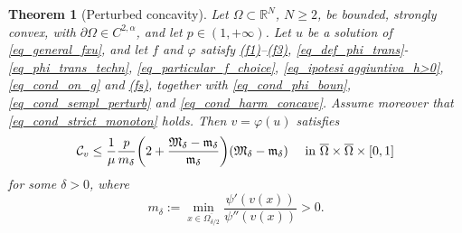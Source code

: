\documentclass[11pt, reqno]{amsart}
\newtheorem{theorem}[lemma]{Theorem}
\theoremstyle{definition}
\numberwithin{equation}{section}
\newcommand{\R}{\mathbb{R}}
\newcommand{\mc}[1]{\mathcal{#1}}
\begin{document}
\begin{theorem}[Perturbed concavity]
\label{thm_gen_perturb_concav}
Let $\Omega \subset \R^N$, $N\geq 2$, be bounded, strongly convex, with $\partial \Omega \in C^{2,\alpha}$, and let $p\in (1,+\infty)$.
Let $u$ be a solution of \eqref{eq_general_fxu}, and let $f$ and $\varphi$ satisfy \hyperlink{(f1)}{\rm{(f1)}}--\hyperlink{(f3)}{\rm{(f3)}}, \eqref{eq_def_phi_trans}-\eqref{eq_phi_trans_techn}, \eqref{eq_particular_f_choice}, \eqref{eq_ipotesi aggiuntiva_h>0}, \eqref{eq_cond_on_g} and \hyperlink{(fs)}{\rm{(fs)}}, together with \eqref{eq_cond_phi_boun}, \eqref{eq_cond_sempl_perturb} and \eqref{eq_cond_harm_concave}. 
Assume moreover that \eqref{eq_cond_strict_monoton} holds. 
Then $v=\varphi(u)$ satisfies 
\begin{equation}\label{eq_general_error_estimate}
\mc{C}_{v} \leq \frac{1}{\mu} \frac{p}{m_{\delta}} \bigg( 2 + \frac{\mathfrak{M}_{\delta} - \mathfrak{m}_{\delta}}{\mathfrak{m}_{\delta}}\bigg) (\mathfrak{M}_{\delta}-\mathfrak{m}_{\delta}) \quad \hbox{ in $ \overline{\Omega} \times \overline{\Omega} \times [0,1]$}
\end{equation}
for some $\delta>0$, where
$$m_{\delta} := \min_{x \in \overline{\Omega_{\delta/2}} } \frac{\psi'(v(x))}{\psi''(v(x))}>0.$$
\end{theorem}
\end{document}
